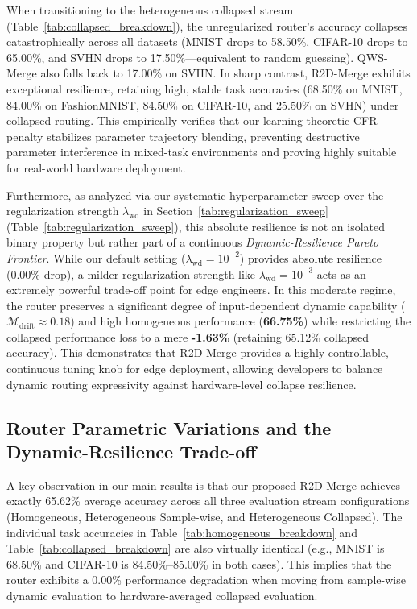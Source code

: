 When transitioning to the heterogeneous collapsed stream (Table~\ref{tab:collapsed_breakdown}), the unregularized router's accuracy collapses catastrophically across all datasets (MNIST drops to 58.50\%, CIFAR-10 drops to 65.00\%, and SVHN drops to 17.50\%---equivalent to random guessing). QWS-Merge also falls back to 17.00\% on SVHN. 
In sharp contrast, R2D-Merge exhibits exceptional resilience, retaining high, stable task accuracies (68.50\% on MNIST, 84.00\% on FashionMNIST, 84.50\% on CIFAR-10, and 25.50\% on SVHN) under collapsed routing. This empirically verifies that our learning-theoretic CFR penalty stabilizes parameter trajectory blending, preventing destructive parameter interference in mixed-task environments and proving highly suitable for real-world hardware deployment.

Furthermore, as analyzed via our systematic hyperparameter sweep over the regularization strength $\lambda_{\text{wd}}$ in Section~\ref{tab:regularization_sweep} (Table~\ref{tab:regularization_sweep}), this absolute resilience is not an isolated binary property but rather part of a continuous \emph{Dynamic-Resilience Pareto Frontier}. While our default setting ($\lambda_{\text{wd}} = 10^{-2}$) provides absolute resilience (0.00\% drop), a milder regularization strength like $\lambda_{\text{wd}} = 10^{-3}$ acts as an extremely powerful trade-off point for edge engineers. In this moderate regime, the router preserves a significant degree of input-dependent dynamic capability ($\mathcal{M}_{\text{drift}} \approx 0.18$) and high homogeneous performance (\textbf{66.75\%}) while restricting the collapsed performance loss to a mere \textbf{-1.63\%} (retaining 65.12\% collapsed accuracy). This demonstrates that R2D-Merge provides a highly controllable, continuous tuning knob for edge deployment, allowing developers to balance dynamic routing expressivity against hardware-level collapse resilience.

\subsection{Router Parametric Variations and the Dynamic-Resilience Trade-off}
A key observation in our main results is that our proposed R2D-Merge achieves exactly 65.62\% average accuracy across all three evaluation stream configurations (Homogeneous, Heterogeneous Sample-wise, and Heterogeneous Collapsed). The individual task accuracies in Table~\ref{tab:homogeneous_breakdown} and Table~\ref{tab:collapsed_breakdown} are also virtually identical (e.g., MNIST is 68.50\% and CIFAR-10 is 84.50\%--85.00\% in both cases). This implies that the router exhibits a 0.00\% performance degradation when moving from sample-wise dynamic evaluation to hardware-averaged collapsed evaluation.

